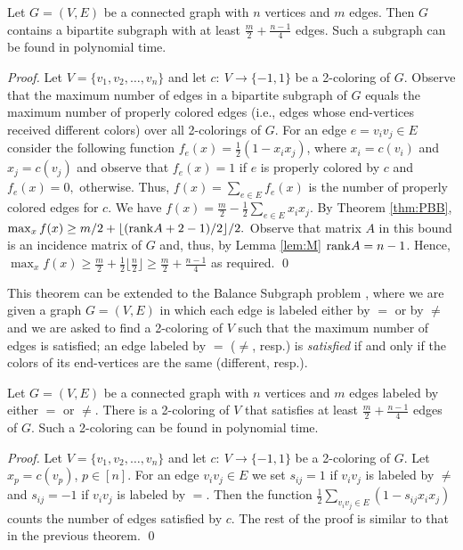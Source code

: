 \documentclass{llncs}
\begin{document}
\begin{theorem}
Let $G=(V,E)$ be a connected graph with $n$ vertices and $m$ edges. Then $G$ contains a bipartite subgraph with at least $\frac{m}{2} + \frac{n-1}{4}$ edges. Such a subgraph can be found in polynomial time.
\end{theorem}
\begin{proof}
Let $V=\{v_1,v_2,\ldots , v_n\}$ and let $c:\ V\rightarrow \{-1,1\}$ be a 2-coloring of $G$. Observe that the maximum number of edges in a bipartite subgraph of $G$ equals the maximum number of properly colored edges (i.e.,
edges whose end-vertices received different colors) over all 2-colorings of $G$. For an edge $e=v_iv_j\in E$ consider the following function $f_e(x)=\frac{1}{2}(1-x_ix_j)$, where $x_i=c(v_i)$ and $x_j=c(v_j)$ and observe that $f_e(x)=1$ if $e$ is properly colored by $c$ and $f_e(x)=0,$ otherwise. Thus, $f(x)=\sum_{e\in E}f_e(x)$ is the number of properly colored edges for $c$.
We have $f(x)=\frac{m}{2}-\frac{1}{2}\sum_{e\in E}x_ix_j$. By Theorem \ref{thm:PBB}, $\max_x f(x)\ge m/2 + \lfloor ({\rm rank} A +2 -1)/2\rfloor/2.$ Observe that matrix $A$ in this bound is  an incidence matrix of $G$ and, thus, by Lemma \ref{lem:M} ${\rm rank} A = n-1$. Hence, $\max_x f(x)\ge \frac{m}{2} + \frac{1}{2}\lfloor \frac{n}{2} \rfloor \ge \frac{m}{2} + \frac{n-1}{4}$ as required.
\qed \end{proof}

This theorem can be extended to the {\sc Balance Subgraph} problem \cite{BocHufTruWah2009}, where we are given a graph $G=(V,E)$ in which each edge is labeled either by $=$ or by $\neq$ and we are asked to find a 2-coloring of $V$ such that the maximum number of edges is satisfied; an edge labeled by $=$ ($\neq$, resp.) is {\em satisfied} if and only if the colors of its end-vertices
are the same (different, resp.).

\begin{theorem}
Let $G=(V,E)$ be a connected graph with $n$ vertices and $m$ edges labeled by either $=$ or $\neq$. There is a 2-coloring of $V$ that satisfies at least $\frac{m}{2} + \frac{n-1}{4}$ edges of $G$. Such a 2-coloring can be found in polynomial time.
\end{theorem}
\begin{proof}
Let $V=\{v_1,v_2,\ldots , v_n\}$ and let $c:\ V\rightarrow \{-1,1\}$ be a 2-coloring of $G$. Let $x_p=c(v_p)$, $p\in [n].$
For an edge $v_iv_j\in E$ we set $s_{ij}=1$ if $v_iv_j$ is labeled by $\neq$ and $s_{ij}=-1$ if $v_iv_j$ is labeled by $=$. Then the function $\frac{1}{2}\sum_{v_iv_j\in E}(1-s_{ij}x_ix_j)$ counts the number of edges satisfied by $c$. The rest of the proof is similar to that in the previous theorem.
\qed \end{proof}
\end{document}
